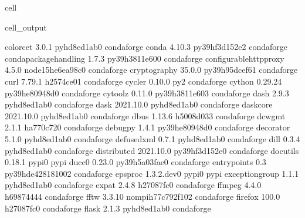 \documentclass[letterpaper,table,10pt,english]{jupyterBook}
\begin{document}
\begin{sphinxuseclass}{cell}
\begin{sphinxVerbatimOutput}
\begin{sphinxuseclass}{cell_output}
\begin{sphinxVerbatim}[commandchars=\\\{\}]
colorcet                  3.0.1              pyhd8ed1ab\PYGZus{}0    conda\PYGZhy{}forge
conda                     4.10.3           py39hf3d152e\PYGZus{}2    conda\PYGZhy{}forge
conda\PYGZhy{}package\PYGZhy{}handling    1.7.3            py39h3811e60\PYGZus{}0    conda\PYGZhy{}forge
configurable\PYGZhy{}http\PYGZhy{}proxy   4.5.0           node15\PYGZus{}he6ea98c\PYGZus{}0    conda\PYGZhy{}forge
cryptography              35.0.0           py39h95dcef6\PYGZus{}1    conda\PYGZhy{}forge
curl                      7.79.1               h2574ce0\PYGZus{}1    conda\PYGZhy{}forge
cycler                    0.10.0                     py\PYGZus{}2    conda\PYGZhy{}forge
cython                    0.29.24          py39he80948d\PYGZus{}0    conda\PYGZhy{}forge
cytoolz                   0.11.0           py39h3811e60\PYGZus{}3    conda\PYGZhy{}forge
dash                      2.9.3              pyhd8ed1ab\PYGZus{}0    conda\PYGZhy{}forge
dask                      2021.10.0          pyhd8ed1ab\PYGZus{}0    conda\PYGZhy{}forge
dask\PYGZhy{}core                 2021.10.0          pyhd8ed1ab\PYGZus{}0    conda\PYGZhy{}forge
dbus                      1.13.6               h5008d03\PYGZus{}3    conda\PYGZhy{}forge
dcw\PYGZhy{}gmt                   2.1.1                ha770c72\PYGZus{}0    conda\PYGZhy{}forge
debugpy                   1.4.1            py39he80948d\PYGZus{}0    conda\PYGZhy{}forge
decorator                 5.1.0              pyhd8ed1ab\PYGZus{}0    conda\PYGZhy{}forge
defusedxml                0.7.1              pyhd8ed1ab\PYGZus{}0    conda\PYGZhy{}forge
dill                      0.3.4              pyhd8ed1ab\PYGZus{}0    conda\PYGZhy{}forge
distributed               2021.10.0        py39hf3d152e\PYGZus{}0    conda\PYGZhy{}forge
docutils                  0.18.1                   pypi\PYGZus{}0    pypi
ducc0                     0.23.0           py39h5a03fae\PYGZus{}0    conda\PYGZhy{}forge
entrypoints               0.3             py39hde42818\PYGZus{}1002    conda\PYGZhy{}forge
epsproc                   1.3.2.dev0               pypi\PYGZus{}0    pypi
exceptiongroup            1.1.1              pyhd8ed1ab\PYGZus{}0    conda\PYGZhy{}forge
expat                     2.4.8                h27087fc\PYGZus{}0    conda\PYGZhy{}forge
ffmpeg                    4.4.0                h6987444\PYGZus{}4    conda\PYGZhy{}forge
fftw                      3.3.10          nompi\PYGZus{}h77c792f\PYGZus{}102    conda\PYGZhy{}forge
firefox                   100.0                h27087fc\PYGZus{}0    conda\PYGZhy{}forge
flask                     2.1.3              pyhd8ed1ab\PYGZus{}0    conda\PYGZhy{}forge

\end{sphinxVerbatim}
\end{sphinxuseclass}
\end{sphinxVerbatimOutput}
\end{sphinxuseclass}
\end{document}
